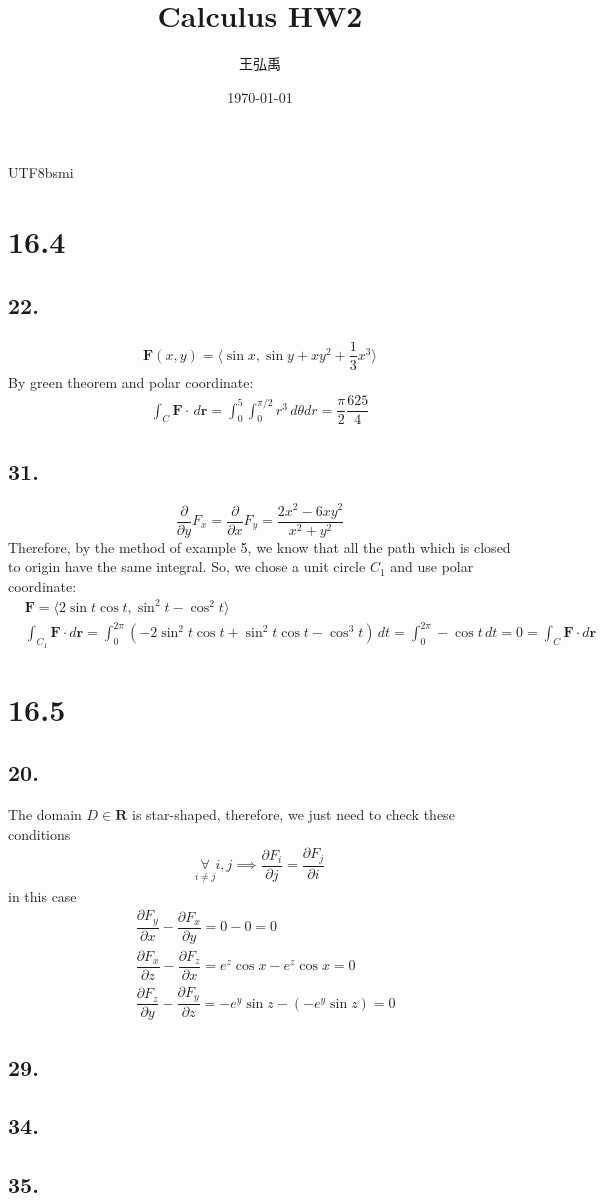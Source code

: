\documentclass[12pt, a4paper]{article}
\title{\textbf{Calculus HW2}}
\author{王弘禹}
\date\today
\begin{document}
\begin{CJK*}{UTF8}{bsmi}
\linespread{1.5}
\maketitle
\newcommand{\st}[1]{\section*{#1}}
\newcommand{\sst}[1]{\subsection*{#1}}
\newcommand{\ssst}[1]{\subsubsection*{#1}}
\newcommand{\dsp}{\displaystyle}
\newcommand{\dx}{\,dx}
\newcommand{\dphi}{\,d\phi}
\newcommand{\dtheta}{\,d\theta}
\newcommand{\dy}{\,dy}
\newcommand{\dz}{\,dz}
\newcommand{\dr}{\,dr}
\newcommand{\drho}{\,d\rho}
\newcommand{\dt}{\,dt}
\st{16.4}
\sst{22.}
\begin{align}
    \textbf{F}(x,y)=\langle\sin x,\sin y+xy^2+\dfrac{1}{3}x^3\rangle
\end{align}
By green theorem and polar coordinate:
\begin{align}
    \int_C \textbf{F}\cdot \,d\textbf{r} = \int_0^5\int_0^{\pi/2}r^3\dtheta dr=\dfrac{\pi}{2}\dfrac{625}{4}
\end{align}
\sst{31.}
\begin{equation}
    \dfrac{\partial}{\partial y}F_x=\dfrac{\partial }{\partial x}F_y = \dfrac{2x^2-6xy^2}{x^2+y^2}
\end{equation}
Therefore, by the method of example 5, we know that all the path which is closed to origin have the same integral. So, we chose a unit circle $C_1$ and use polar coordinate:
\begin{align}
    &\textbf{F} = \langle 2\sin t\cos t, \sin^2 t-\cos^2 t\rangle\\
    &\int_{C_1}\textbf{F}\cdot d\textbf{r}=\int_0^{2\pi} (-2\sin^2 t\cos t+\sin^2 t\cos t-\cos^3 t)\dt=\int_0^{2\pi}-\cos t\dt =0=\int_{C}\textbf{F}\cdot d\textbf{r}
\end{align}

\st{16.5}
\sst{20.}
The domain $D\in\textbf{R}$ is star-shaped, therefore, we just need to check these conditions
\begin{align}
    \mathop{\forall}\limits_{i\ne j} i,j\implies \dfrac{\partial F_i}{\partial j}=\dfrac{\partial F_j}{\partial i}
\end{align}
in this case
\begin{align}
    &\dfrac{\partial F_y}{\partial x} - \dfrac{\partial F_x}{\partial y} = 0-0=0\\
    &\dfrac{\partial F_x}{\partial z} - \dfrac{\partial F_z}{\partial x} = e^z\cos x - e^z \cos x=0\\
    &\dfrac{\partial F_z}{\partial y} - \dfrac{\partial F_y}{\partial z} = -e^y\sin z - (-e^y\sin z) = 0
\end{align}


\sst{29.}
\sst{34.}
\sst{35.}

\end{CJK*}
\end{document}

